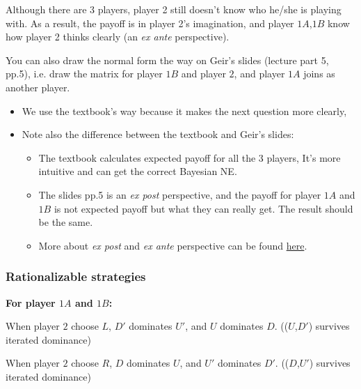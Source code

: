 \documentclass{article}
\begin{document}
\begin{mdframed}[backgroundcolor=blue!20,linecolor=white]
Although there are 3 players, player 2 still doesn't know who he/she is playing with. As a result, the payoff is in player 2's imagination, and player $1A$,$1B$ know how player 2 thinks clearly (an \textit{ex ante} perspective).

\medskip

You can also draw the normal form the way on Geir's slides (lecture part 5, pp.5), i.e. draw
the matrix for player $1B$ and player $2$, and player $1A$ joins as another player. 

\begin{itemize}
\item We use the textbook's way because it makes the next question more clearly,
\item Note also the difference between the textbook and Geir's slides:
\begin{itemize}

\item The textbook calculates expected payoff for all the 3 players,  It's more intuitive and can get the correct Bayesian NE.

\item The slides pp.5 is an \textit{ex post} perspective, and the payoff for player $1A$ and $1B$ is not expected payoff but what they can really get. The result should be the same.

\item More about \textit{ex post} and \textit{ex ante} perspective can be found \href{https://www.cs.toronto.edu/~cebly/2534/Notes/CSC2534_Lecture9.pdf}{here}.
\end{itemize}

\end{itemize}

\end{mdframed}

\subsubsection*{Rationalizable strategies}
\vspace{2mm}

\textbf{For player $1A$ and $1B$:}

When player $2$ choose $L$,  $D'$ dominates $U'$, and $U$ dominates $D$. (($U$,$D'$) survives iterated dominance)

When player $2$ choose $R$, $D$ dominates $U$, and  $U'$ dominates $D'$. (($D$,$U'$) survives iterated dominance)
\end{document}
